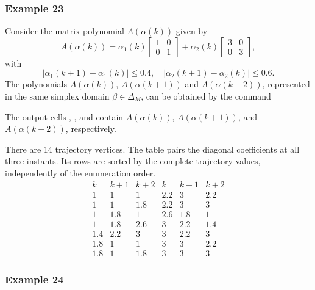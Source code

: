 \documentclass[english,11pt]{article}
\theoremstyle{break} \theorembodyfont{\small\rm}
\begin{document}
\subsubsection*{Example 23}

Consider the matrix polynomial $A(\alpha(k))$ given by
\[
 A(\alpha(k)) = \alpha_1(k) \begin{bmatrix} 1 & 0 \\ 0 & 1 \end{bmatrix} + \alpha_2(k) \begin{bmatrix} 3 & 0 \\ 0 & 3 \end{bmatrix},
\]
with
\[
 |\alpha_1(k+1) - \alpha_1(k)| \leq 0.4, \quad  |\alpha_2(k+1) - \alpha_2(k)| \leq 0.6.
\]
The polynomials $A(\alpha(k))$, $A(\alpha(k+1))$ and $A(\alpha(k+2))$, represented in the same simplex domain $\beta \in \Delta_M$,
can be obtained by the command

\vspace{0.5cm}%
\noindent\begin{minipage}{\linewidth}
\end{minipage}
\vspace{0.2cm}

The output cells , , and
 contain $A(\alpha(k))$, $A(\alpha(k+1))$, and
$A(\alpha(k+2))$, respectively.

There are 14 trajectory vertices. The table pairs the diagonal
coefficients at all three instants. Its rows are sorted by the complete
trajectory values, independently of the enumeration order.
\[
\begin{array}{rrr|rrr}
 k & k+1 & k+2 & k & k+1 & k+2\\ \hline
 1   & 1   & 1   & 2.2 & 3   & 2.2\\
 1   & 1   & 1.8 & 2.2 & 3   & 3\\
 1   & 1.8 & 1   & 2.6 & 1.8 & 1\\
 1   & 1.8 & 2.6 & 3   & 2.2 & 1.4\\
 1.4 & 2.2 & 3   & 3   & 2.2 & 3\\
 1.8 & 1   & 1   & 3   & 3   & 2.2\\
 1.8 & 1   & 1.8 & 3   & 3   & 3
\end{array}
\]



\subsubsection*{Example 24}
\end{document}
